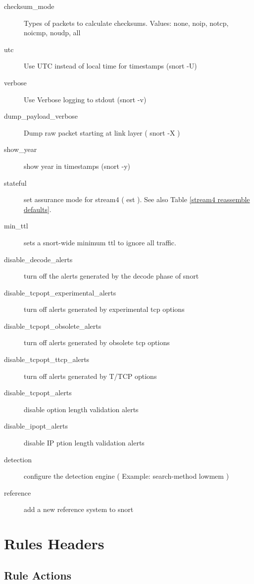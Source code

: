 \documentclass[english]{report}
\begin{document}
\begin{description}
\item [checksum\_mode]Types of packets to calculate checksums. Values:
none, noip, notcp, noicmp, noudp, all
\item [utc]Use UTC instead of local time for timestamps (snort -U)
\item [verbose]Use Verbose logging to stdout (snort -v)
\item [dump\_payload\_verbose]Dump raw packet starting at link layer ( snort -X )
\item [show\_year]show year in timestamps (snort -y)
\item [stateful]set assurance mode for stream4 ( est ). See also Table
\ref{stream4 reassemble defaults}.
\item [min\_ttl]sets a snort-wide minimum ttl to ignore all traffic.
\item [disable\_decode\_alerts]turn off the alerts generated by the decode phase of snort
\item [disable\_tcpopt\_experimental\_alerts]turn off alerts generated by experimental tcp options
\item [disable\_tcpopt\_obsolete\_alerts]turn off alerts generated by obsolete tcp options
\item [disable\_tcpopt\_ttcp\_alerts]turn off alerts generated by T/TCP options
\item [disable\_tcpopt\_alerts] disable option length validation alerts
\item [disable\_ipopt\_alerts] disable IP ption length validation alerts
\item [detection] configure the detection engine ( Example: search-method lowmem )
\item [reference] add a new reference system to snort
\end{description}

\section{Rules Headers}


\subsection{Rule Actions \label{rules action section}}
\end{document}
